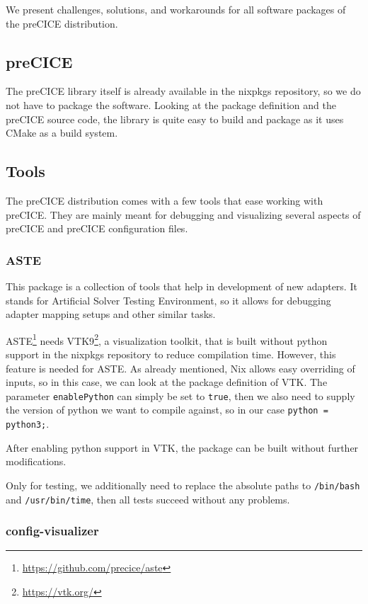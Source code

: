 \documentclass{eceasst}
\begin{document}
We present challenges, solutions, and workarounds for all software packages of the preCICE distribution. 


\subsection{preCICE}

The preCICE library itself is already available in the nixpkgs repository, so we do not have to package the software.
Looking at the package definition and the preCICE source code, the library is quite easy to build and package as it uses CMake as a build system.

\subsection{Tools}

The preCICE distribution comes with a few tools that ease working with preCICE.
They are mainly meant for debugging and visualizing several aspects of preCICE and preCICE configuration files.

\subsubsection{ASTE}

This package is a collection of tools that help in development of new adapters.
It stands for Artificial Solver Testing Environment, so it allows for debugging adapter mapping setups and other similar tasks.

ASTE\footnote{\url{https://github.com/precice/aste}} needs VTK9\footnote{\url{https://vtk.org/}}, a visualization toolkit, that is built without python support in the nixpkgs repository to reduce compilation time.
However, this feature is needed for ASTE.
As already mentioned, Nix allows easy overriding of inputs, so in this case, we can look at the package definition of VTK.
The parameter \texttt{enablePython} can simply be set to \texttt{true}, then we also need to supply the version of python we want to compile against, so in our case \texttt{python = python3;}.

After enabling python support in VTK, the package can be built without further modifications.

Only for testing, we additionally need to replace the absolute paths to \texttt{/bin/bash} and \texttt{/usr/bin/time}, then all tests succeed without any problems.

\subsubsection{config-visualizer}
\end{document}
